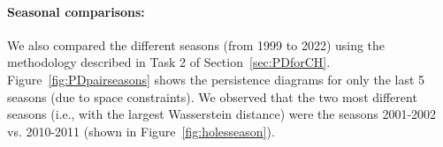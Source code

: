 \paragraph{Seasonal comparisons:}
\label{sec:results:seasonalcompare}
We also compared the different seasons (from 1999 to 2022) using the methodology described in Task 2 of Section~\ref{sec:PDforCH}.
Figure~\ref{fig:PDpairseasons} shows the persistence diagrams for only the last 5 seasons (due to space constraints).
We observed that the two most different seasons (i.e., with the largest Wasserstein distance) were the seasons 2001-2002 vs. 2010-2011 (shown 
in Figure~\ref{fig:holesseason}). 












